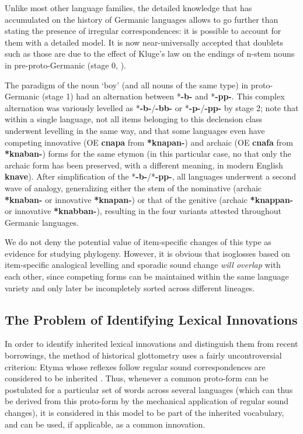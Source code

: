 \documentclass[svgnames,12pt]{scrartcl}
\newcommand{\ipa}[1]{\textbf{{\phon\mbox{#1}}}}
\begin{document}
{{Unlike most other language families, the detailed knowledge that has accumulated on the history of Germanic languages allows to go further than stating the presence of irregular correspondences: it is possible to account for them with a detailed model. It is now near-universally accepted that doublets such as those are due to the effect of Kluge's law on the endings of n-stem nouns in pre-proto-Germanic (stage 0, \citealt{kluge1884dehnung, kroonen11nstems}). 

The paradigm of the noun `boy' (and all nouns of the same type) in proto-Germanic  (stage 1) had an alternation between *\ipa{-b-} and *\ipa{-pp-}. This complex  alternation was variously levelled as *\ipa{-b-}/\ipa{-bb-} or *\ipa{-p-}/\ipa{-pp-} by stage 2; note that within a single language, not all items belonging to this declension class underwent levelling in the same way, and that some languages even have competing innovative (OE \ipa{cnapa}  from \ipa{*knapan-}) and archaic (OE \ipa{cnafa}  from \ipa{*knaban-}) forms for the same etymon (in this particular case, no that only the archaic form has been preserved, with a different meaning, in modern English \ipa{knave}).
After simplification of the *\ipa{-b-}/*\ipa{-pp-}, all languages underwent a second wave of analogy, generalizing either the stem of the nominative (archaic \ipa{*knaban-} or innovative \ipa{*knapan-}) or that of the genitive (archaic \ipa{*knappan-} or innovative \ipa{*knabban-}), resulting in the four variants attested throughout Germanic languages.

We do not deny the potential value of item-specific changes of this type as evidence for studying
phylogeny. However, it is obvious that isoglosses based on item-specific analogical levelling and
sporadic sound change \emph{will overlap} with each other, since competing forms can be maintained
within the same language variety and only later be incompletely sorted across different lineages.


\subsection{The Problem of Identifying Lexical Innovations}
In order to identify inherited lexical innovations and distinguish them from recent borrowings, the
method of historical glottometry uses a fairly uncontroversial criterion: Etyma whose reflexes
follow regular sound correspondences are considered to be inherited \citet[176-8]{Francois2015}.
Thus, whenever a common proto-form can be postulated for a particular set of words across several
languages (which can thus be derived from this proto-form by the mechanical application of regular
sound changes), it is considered in this model to be part of the inherited vocabulary, and can be
used, if applicable, as a common innovation.

}}
\end{document}
